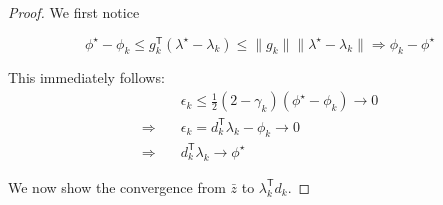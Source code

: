 \documentclass[../main]{subfiles}
\begin{document}
\begin{proof}
  We first notice

  \[
    \phi^\star - \phi_k \le g_k^\mathsf{T} (\lambda^\star - \lambda_k)\le \|g_k\|\|\lambda^\star - \lambda_k\| \Rightarrow \phi_k -\phi^\star
  \]

  This immediately follows:
  \begin{subequations}
    \begin{align}\label{eq:eps_subgrad_to_subgrad}
                        & \epsilon_k \le \frac{1}{2}(2 - \gamma_k) ( \phi^\star - \phi_k) \to 0 \\
      \Rightarrow \quad & \epsilon_k = d_k^\mathsf{T} \lambda_k - \phi_k \to 0                  \\
      \Rightarrow \quad & d_k^\mathsf{T} \lambda_k \to \phi^\star
    \end{align}
  \end{subequations}

  We now show the convergence from \(\bar z\) to \(\lambda_k ^ \mathsf{T} d_k\).


\end{proof}

\end{document}
